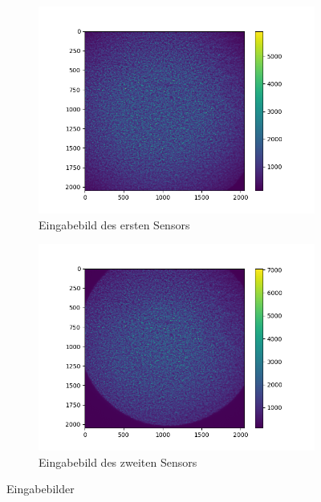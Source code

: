 \begin{figure}[htbp]
	\centering
	\begin{subfigure}[b]{0.45\textwidth}
		\centering
		\includegraphics[width=\textwidth]{img/ref_start0001_1-10}
		\caption[Erster Sensor]{Eingabebild des ersten Sensors}
		\label{fig:eingabe_sensor1}
	\end{subfigure}
	\begin{subfigure}[b]{0.45\textwidth}
		\centering
		\includegraphics[width=\textwidth]{img/E10001}
		\caption[Zweiter Sensor]{Eingabebild des zweiten Sensors}
		\label{fig:eingabe_sensor2}
	\end{subfigure}
	\caption[Eingabe]{Eingabebilder}
	\label{fig:eingabebilder}
\end{figure}

